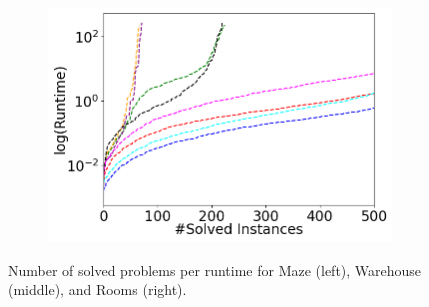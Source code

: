 \documentclass[letterpaper]{article} %
\def\
UrlFont{\rm}  %
\theoremstyle{definition}
\begin{document}
{\begin{figure}[tbhp]
\begin{subfigure}[b]{0.69\columnwidth}
    \end{subfigure}
    \begin{subfigure}[b]{0.69\columnwidth}\centering
      \includegraphics[width=\columnwidth]{Figures/room/mixed_small_figures/Cactus.png}
    \end{subfigure}
    \caption{Number of solved problems per runtime for Maze (left), Warehouse (middle), and Rooms (right).}
    \label{fig:rt-soc-results}
\end{figure}
}
\end{document}
